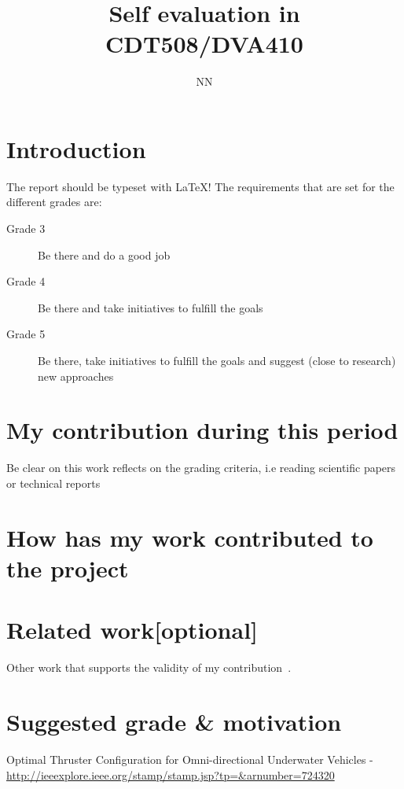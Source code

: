 \documentclass[11pt,a4paper]{amsart}
\title{Self evaluation in CDT508/DVA410}
\author{NN}
\date{}                                           %
\begin{document}
\maketitle
\thispagestyle{fancy}
\section{Introduction}
The report should be typeset with \LaTeX !
The requirements that are set for the different grades are:
\begin{description}
\item[Grade 3] Be there and do a good job
\item[Grade 4] Be there and take initiatives to fulfill the goals
\item[Grade 5] Be there, take initiatives to fulfill the goals and suggest (close to research) new approaches
\end{description}

\section{My contribution during this period}
Be clear on this work reflects on the grading criteria, i.e reading scientific papers~\cite{Ekstrom20011845221} or technical reports~\cite{thruster}
\section{How has my work contributed to the project}

\section{Related work[optional]}
Other work that supports the validity of my contribution~\cite{Ekstrom20011845221}.\\

\section{Suggested grade \& motivation}


\begin{thebibliography}{99}
Optimal Thruster Configuration for Omni-directional Underwater Vehicles - \url{http://ieeexplore.ieee.org/stamp/stamp.jsp?tp=&arnumber=724320}
\end{thebibliography}


\end{document}
